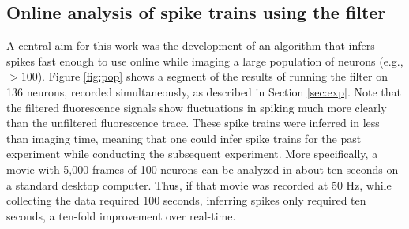 




\subsection{Online analysis of spike trains using the \foopsi filter}

A central aim for this work was the development of an algorithm that infers spikes fast enough to use online while imaging a large population of neurons (e.g., $> 100$).  Figure \ref{fig:pop} shows a segment of the results of running the \foopsi filter on 136 neurons, recorded simultaneously, as described in Section \ref{sec:exp}.  Note that the filtered fluorescence signals show fluctuations in spiking much more clearly than the unfiltered fluorescence trace. These spike trains were inferred in less than imaging time, meaning that one could infer spike trains for the past experiment while conducting the subsequent experiment. More specifically, a movie with 5,000 frames of 100 neurons can be analyzed in about ten seconds on a standard desktop computer.  Thus, if that movie was recorded at 50 Hz, while collecting the data required 100 seconds, inferring spikes only required ten seconds, a ten-fold improvement over real-time.  


